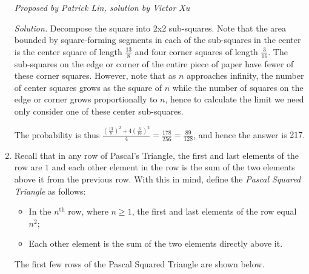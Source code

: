 \documentclass[10pt]{article}
\newcommand{\proposed}[1]
{
\vspace{5pt}
\noindent\textit{Proposed by #1}
}
\newcommand{\solution}
{
\vspace{5pt}
\noindent\textit{Solution.}\qquad
}
\begin{document}
\begin{enumerate}
\proposed{Patrick Lin, solution by Victor Xu}

\solution Decompose the square into 2x2 sub-squares. Note that the area bounded by square-forming segments in each of the sub-squares in the center is the center square of length $\tfrac{13}{8}$ and four corner squares of length $\tfrac{3}{16}$. The sub-squares on the edge or corner of the entire piece of paper have fewer of these corner squares. However, note that as $n$ approaches infinity, the number of center squares grows as the square of $n$ while the number of squares on the edge or corner grows proportionally to $n$, hence to calculate the limit we need only consider one of these center sub-squares.

\par The probability is thus $\frac{(\tfrac{13}{8})^2 + 4(\tfrac{3}{16})^2}{4} = \frac{178}{256} = \frac{89}{128}$, and hence the answer is $\boxed{217}$.

\item Recall that in any row of Pascal's Triangle, the first and last elements of the row are $1$ and each other element in the row is the sum of the two elements above it from the previous row.  With this in mind, define the \textit{Pascal Squared Triangle} as follows:

\begin{itemize}

\item In the $n^{\text{th}}$ row, where $n\geq 1$, the first and last elements of the row equal $n^2$;

\item Each other element is the sum of the two elements directly above it.

\end{itemize}

The first few rows of the Pascal Squared Triangle are shown below.


\end{enumerate}
\end{document}
